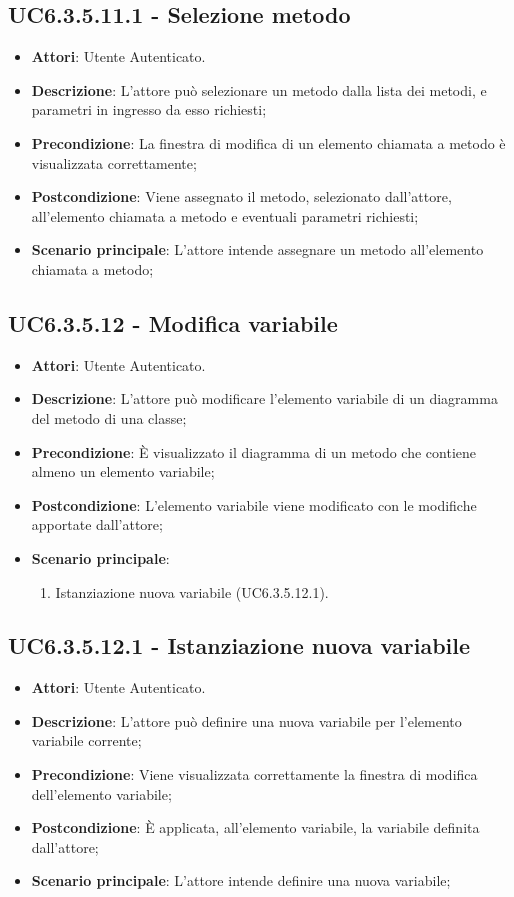 \subsection{UC6.3.5.11.1 - Selezione metodo} 
\label{ssec:UC6.3.5.11.1} 
\begin{itemize} 
\item \textbf{Attori}: Utente Autenticato.
\item \textbf{Descrizione}: L'attore può selezionare un metodo dalla lista dei metodi, e parametri in ingresso da esso richiesti;
\item \textbf{Precondizione}: La finestra di modifica di un elemento chiamata a metodo è visualizzata correttamente;
\item \textbf{Postcondizione}: Viene assegnato il metodo, selezionato dall'attore, all'elemento chiamata a metodo e eventuali parametri richiesti;
\item \textbf{Scenario principale}: L'attore intende assegnare un metodo all'elemento chiamata a metodo;\end{itemize} 
\subsection{UC6.3.5.12 - Modifica variabile} 
\label{ssec:UC6.3.5.12} 
\begin{itemize} 
\item \textbf{Attori}: Utente Autenticato.
\item \textbf{Descrizione}: L'attore può modificare l'elemento variabile di un diagramma del metodo di una classe;
\item \textbf{Precondizione}: È visualizzato il diagramma di un metodo che contiene almeno un elemento variabile;
\item \textbf{Postcondizione}: L'elemento variabile viene modificato con le modifiche apportate dall'attore;
\item \textbf{Scenario principale}: \begin{enumerate}\item Istanziazione nuova variabile (UC6.3.5.12.1). 
 \end{enumerate}
\end{itemize} 
\subsection{UC6.3.5.12.1 - Istanziazione nuova variabile} 
\label{ssec:UC6.3.5.12.1} 
\begin{itemize} 
\item \textbf{Attori}: Utente Autenticato.
\item \textbf{Descrizione}: L'attore può definire una nuova variabile per l'elemento variabile corrente;
\item \textbf{Precondizione}: Viene visualizzata correttamente la finestra di modifica dell'elemento variabile;
\item \textbf{Postcondizione}: È applicata, all'elemento variabile, la variabile definita dall'attore;
\item \textbf{Scenario principale}: L'attore intende definire una nuova variabile;\end{itemize} 
